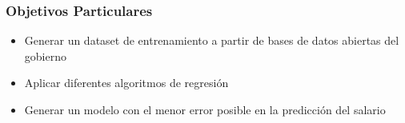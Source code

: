 \subsubsection{Objetivos Particulares}
\begin{itemize}
    \item Generar un dataset de entrenamiento a partir de bases de datos abiertas del gobierno
    \item Aplicar diferentes algoritmos de regresi\'on
    \item Generar un modelo con el menor error posible en la predicci\'on del salario
\end{itemize}
